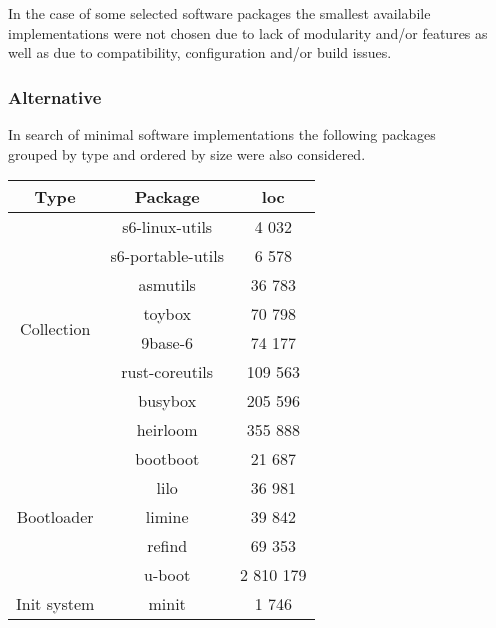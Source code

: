 In the case of some selected software packages the smallest availabile implementations were not chosen due to lack of modularity and/or features as well as due to compatibility, configuration and/or build issues.

\newpage

\subsubsection{Alternative}

In search of minimal software implementations the following packages\\ grouped by type and ordered by size were also considered.

\begin{table}[!ht]
    \centering
    \begin{tabular}{|c|c|c|}
        \hline
        Type & Package & \gls{loc} \\
        \hline
        \hline
        \multirow{8}{*}{Collection}
        & s6-linux-utils \cite{s6-linux} & 4 032 \\
        \cline{2-3}
        & s6-portable-utils \cite{s6-portable} & 6 578 \\
        \cline{2-3}
        & asmutils \cite{asmutils} & 36 783 \\ %
        \cline{2-3}
        & toybox \cite{toybox} & 70 798 \\
        \cline{2-3}
        & 9base-6 \cite{9base} & 74 177 \\
        \cline{2-3}
        & rust-coreutils \cite{rust-coreutils} & 109 563 \\ %
        \cline{2-3}
        & busybox \cite{busybox} & 205 596 \\
        \cline{2-3}
        & heirloom \cite{heirloom} \footnotemark[3] & 355 888 \\
        \hline
        \hline
        \multirow{5}{*}{Bootloader}
        & bootboot \cite{bootboot} & 21 687 \\
        \cline{2-3}
        & lilo \cite{lilo} & 36 981 \\
        \cline{2-3}
        & limine \cite{limine} & 39 842 \\
        \cline{2-3}
        & refind \cite{refind} & 69 353 \\
        \cline{2-3}
        & u-boot \cite{uboot} & 2 810 179 \\
        \hline
        \hline
        \multirow{11}{*}{Init system}
        & minit \cite{minit} & 1 746 \\

\end{tabular}
\end{table}
